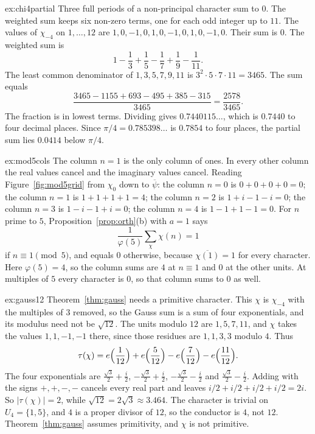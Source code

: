 \begin{solution}{ex:chi4partial}
\idea Three full periods of a non-principal character sum to $0$. The weighted sum keeps six non-zero terms, one for each odd integer up to $11$.
\writeup The values of $\chi_{-4}$ on $1,\dots,12$ are $1,0,-1,0,1,0,-1,0,1,0,-1,0$. Their sum is $0$. The weighted sum is
\[
1-\frac13+\frac15-\frac17+\frac19-\frac1{11}.
\]
The least common denominator of $1,3,5,7,9,11$ is $3^2\cdot5\cdot7\cdot11=3465$. The sum equals
\[
\frac{3465-1155+693-495+385-315}{3465}=\frac{2578}{3465}.
\]
The fraction is in lowest terms. Dividing gives $0.7440115\ldots$, which is $0.7440$ to four decimal places. Since $\pi/4=0.785398\ldots$ is $0.7854$ to four places, the partial sum lies $0.0414$ below $\pi/4$.
\end{solution}

\begin{solution}{ex:mod5cols}
\idea The column $n=1$ is the only column of ones. In every other column the real values cancel and the imaginary values cancel.
\writeup Reading Figure~\ref{fig:mod5grid} from $\chi_0$ down to $\overline\psi$: the column $n=0$ is $0+0+0+0=0$; the column $n=1$ is $1+1+1+1=4$; the column $n=2$ is $1+i-1-i=0$; the column $n=3$ is $1-i-1+i=0$; the column $n=4$ is $1-1+1-1=0$. For $n$ prime to $5$, Proposition~\ref{prop:orth}(b) with $a=1$ says
\[
\frac1{\varphi(5)}\sum_\chi\chi(n)=1
\]
if $n\equiv1\pmod5$, and equals $0$ otherwise, because $\overline{\chi(1)}=1$ for every character. Here $\varphi(5)=4$, so the column sums are $4$ at $n\equiv1$ and $0$ at the other units. At multiples of $5$ every character is $0$, so that column sums to $0$ as well.
\end{solution}

\begin{solution}{ex:gauss12}
\idea Theorem~\ref{thm:gauss} needs a primitive character. This $\chi$ is $\chi_{-4}$ with the multiples of $3$ removed, so the Gauss sum is a sum of four exponentials, and its modulus need not be $\sqrt{12}$.
\writeup The units modulo $12$ are $1,5,7,11$, and $\chi$ takes the values $1,1,-1,-1$ there, since those residues are $1,1,3,3$ modulo $4$. Thus
\[
\tau(\chi)=e\Bigl(\frac1{12}\Bigr)+e\Bigl(\frac5{12}\Bigr)-e\Bigl(\frac7{12}\Bigr)-e\Bigl(\frac{11}{12}\Bigr).
\]
The four exponentials are $\frac{\sqrt3}2+\frac i2$, $-\frac{\sqrt3}2+\frac i2$, $-\frac{\sqrt3}2-\frac i2$ and $\frac{\sqrt3}2-\frac i2$. Adding with the signs $+,+,-,-$ cancels every real part and leaves $i/2+i/2+i/2+i/2=2i$. So $|\tau(\chi)|=2$, while $\sqrt{12}=2\sqrt3\approx3.464$. The character is trivial on $U_4=\{1,5\}$, and $4$ is a proper divisor of $12$, so the conductor is $4$, not $12$. Theorem~\ref{thm:gauss} assumes primitivity, and $\chi$ is not primitive.
\end{solution}

